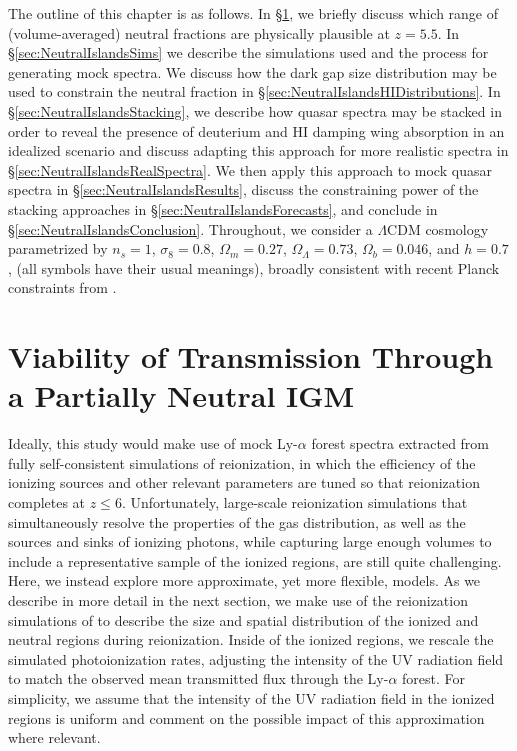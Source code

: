 The outline of this chapter is as follows. In \S\ref{sec:NeutralIslandsViability}, we briefly discuss which range of (volume-averaged) neutral fractions are physically plausible at $z=5.5$. In 
\S \ref{sec:NeutralIslandsSims} we describe the simulations used and the process for generating mock spectra. We discuss how the dark gap size distribution may be used to constrain the neutral fraction in \S \ref{sec:NeutralIslandsHIDistributions}. In \S \ref{sec:NeutralIslandsStacking}, we describe how quasar spectra may be stacked in order to reveal the presence of deuterium and HI damping wing absorption in an idealized scenario and discuss adapting this approach for more realistic spectra in \S \ref{sec:NeutralIslandsRealSpectra}. We then apply this approach to mock quasar spectra in \S \ref{sec:NeutralIslandsResults}, discuss the constraining power of the stacking approaches in \S \ref{sec:NeutralIslandsForecasts}, and conclude in \S \ref{sec:NeutralIslandsConclusion}. Throughout, we consider a $\Lambda$CDM cosmology parametrized by $n_{s} = 1$, $\sigma_{8} = 0.8$, $\Omega_{m} = 0.27$, $\Omega_{\Lambda} = 0.73$, $\Omega_{b} = 0.046$, and $h = 0.7$, (all symbols have their usual meanings), broadly consistent with recent Planck constraints from \citet{Ade:2013zuv}.


\section{Viability of Transmission Through a Partially Neutral IGM} \label{sec:NeutralIslandsViability}

 
 Ideally, this study would make use of mock Ly-$\alpha$ forest spectra extracted from fully self-consistent simulations of reionization, in which the efficiency of the ionizing sources and other relevant parameters are tuned so that reionization completes at $z \leq 6$.
 Unfortunately, large-scale reionization simulations that simultaneously resolve the properties of the gas distribution, as well as the sources and sinks of ionizing photons, while
 capturing large enough volumes to include a representative sample of the ionized regions, are still quite challenging. Here, we instead explore more approximate, yet more flexible, models.
 As we describe in more detail in the next section, we make use of the reionization simulations of \citet{McQuinn:2007dy} to describe the size  and spatial distribution of the ionized and
 neutral regions during reionization. Inside of the ionized regions, we rescale the simulated photoionization rates, adjusting the intensity of the UV radiation field to match the observed mean transmitted flux through the Ly-$\alpha$ forest.
 For simplicity, we assume  that the intensity of the UV radiation field in the ionized regions is uniform and comment on the possible impact of this approximation where relevant.
 
